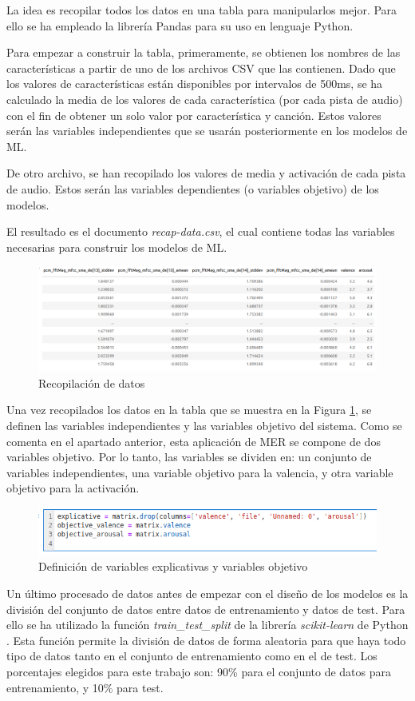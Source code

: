 \documentclass[12pt,a4paper]{article}
\begin{document}
La idea es recopilar todos los datos en una tabla para manipularlos mejor. Para ello se ha empleado la librería Pandas \cite{mckinney-proc-scipy-2010} para su uso en lenguaje Python.


Para empezar a construir la tabla, primeramente, se obtienen los nombres de las características a partir de uno de los archivos CSV que las contienen. Dado que los valores de características están disponibles por intervalos de 500ms, se ha calculado la media de los valores de cada característica (por cada pista de audio) con el fin de obtener un solo valor por característica y canción. Estos valores serán las variables independientes que se usarán posteriormente en los modelos de ML.


De otro archivo, se han recopilado los valores de media y activación de cada pista de audio. Estos serán las variables dependientes (o variables objetivo) de los modelos.


El resultado es el documento \textit{recap-data.csv}, el cual contiene todas las variables necesarias para construir los modelos de ML.

\begin{figure}[H]
	\centering
	\includegraphics[width=1\linewidth]{figs/data}
	\caption{Recopilación de datos}
	\label{fig:data}
\end{figure}
Una vez recopilados los datos en la tabla que se muestra en la Figura \ref{fig:data}, se definen las variables independientes y las variables objetivo del sistema. Como se comenta en el apartado anterior, esta aplicación de MER se compone de dos variables objetivo. Por lo tanto, las variables se dividen en: un conjunto de variables independientes, una variable objetivo para la valencia, y otra variable objetivo para la activación.
\begin{figure}[H]
	\centering
	\includegraphics[width=0.8\linewidth]{figs/variables}
	\caption{Definición de variables explicativas y variables objetivo}
	\label{fig:variables}
\end{figure}
Un último procesado de datos antes de empezar con el diseño de los modelos es la división del conjunto de datos entre datos de entrenamiento y datos de test. Para ello se ha utilizado la función \textit{train\_test\_split} de la librería \textit{scikit-learn} de Python \cite{scikit-learn}. Esta función permite la división de datos de forma aleatoria para que haya todo tipo de datos tanto en el conjunto de entrenamiento como en el de test. Los porcentajes elegidos para este trabajo son: 90\% para el conjunto de datos para entrenamiento, y 10\% para test.
\end{document}

